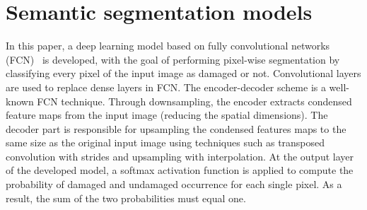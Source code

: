 \documentclass[runningheads]{llncs}
\begin{document}
\section{Semantic segmentation models}
\label{section:semantic_segmentation}
In this paper, a deep learning model based on fully convolutional networks (FCN)~\cite{shelhamer2017fully} is developed, with the goal of performing pixel-wise segmentation by classifying every pixel of the input image as damaged or not. 
Convolutional layers are used to replace dense layers in FCN.
The encoder-decoder scheme is a well-known FCN technique.
Through downsampling, the encoder extracts condensed feature maps from the input image (reducing the spatial dimensions).
The decoder part is responsible for upsampling the condensed features maps to the same size as the original input image using techniques such as transposed convolution with strides and upsampling with interpolation.
At the output layer of the developed model, a softmax activation function is applied to compute the probability of damaged and undamaged occurrence for each single pixel.
As a result, the sum of the two probabilities must equal one.
\end{document}
